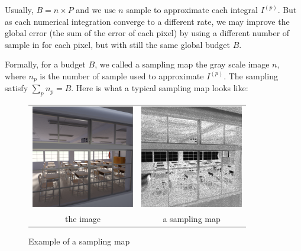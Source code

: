 \documentclass{classeENS}
\begin{document}
\par Usually, $B=n\times P$ and we use $n$ sample to approximate each integral $I^{(p)}$.
But as each numerical integration converge to a different rate, we may improve the global error
(the sum of the error of each pixel) by using a different number of sample in for each pixel,
but with still the same global budget $B$.
\par Formally, for a budget $B$, we called a sampling map the gray scale image $n$, 
where $n_p$ is the number of sample used to approximate $I^{(p)}$. The sampling 
satisfy $\sum_{p} n_p = B$. Here is what a typical sampling map looks like:

\begin{figure}[H]
    \centering
    \caption{Example of a sampling map}
    \begin{tabular}{cc}
    \includegraphics[width=45mm]{image/without/gt.png}
    & \includegraphics[width=45mm]{image/without/sm.png}\\
    the image & a sampling map
    \end{tabular}
\end{figure}
\end{document}
